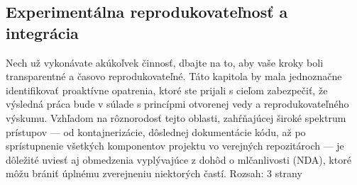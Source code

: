 \subsection{Experimentálna reprodukovateľnosť a integrácia}
Nech už vykonávate akúkoľvek činnosť, dbajte na to, aby vaše kroky boli transparentné a časovo reprodukovateľné. Táto kapitola by mala jednoznačne identifikovať proaktívne opatrenia, ktoré ste prijali s cieľom zabezpečiť, že výsledná práca bude v súlade s princípmi otvorenej vedy a reprodukovateľného výskumu. Vzhľadom na rôznorodosť tejto oblasti, zahŕňajúcej široké spektrum prístupov — od kontajnerizácie, dôslednej dokumentácie kódu, až po sprístupnenie všetkých komponentov projektu vo verejných repozitároch — je dôležité uviesť aj obmedzenia vyplývajúce z dohôd o mlčanlivosti (NDA), ktoré môžu brániť úplnému zverejneniu niektorých častí. Rozsah: 3 strany


